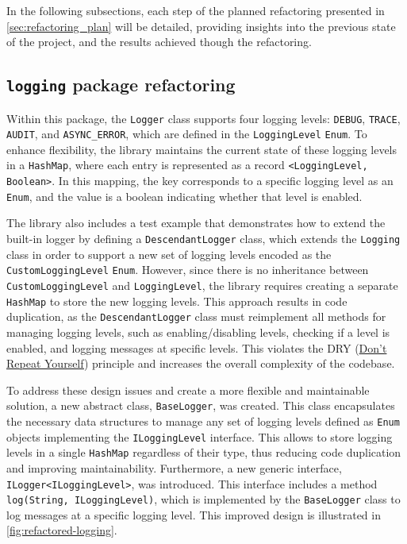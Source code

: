 In the following subsections, each step of the planned refactoring presented in \autoref{sec:refactoring_plan} will be detailed, providing insights into the previous state of the project, and the results achieved though the refactoring.

\subsection{\texttt{logging} package refactoring}

Within this package, the \texttt{Logger} class supports four logging levels: \texttt{DEBUG}, \texttt{TRACE}, \texttt{AUDIT}, and \texttt{ASYNC\_ERROR}, which are defined in the \texttt{LoggingLevel} \texttt{Enum}. To enhance flexibility, the library maintains the current state of these logging levels in a \texttt{HashMap}, where each entry is represented as a record \texttt{<LoggingLevel, Boolean>}. In this mapping, the key corresponds to a specific logging level as an \texttt{Enum}, and the value is a boolean indicating whether that level is enabled.

The library also includes a test example that demonstrates how to extend the built-in logger by defining a \texttt{DescendantLogger} class, which extends the \texttt{Logging} class in order to support a new set of logging levels encoded as the \texttt{CustomLoggingLevel} \texttt{Enum}. However, since there is no inheritance between \texttt{CustomLoggingLevel} and \texttt{LoggingLevel}, the library requires creating a separate \texttt{HashMap} to store the new logging levels. This approach results in code duplication, as the \texttt{DescendantLogger} class must reimplement all methods for managing logging levels, such as enabling/disabling levels, checking if a level is enabled, and logging messages at specific levels. This violates the DRY (\href{https://en.wikipedia.org/wiki/Don%27t_repeat_yourself}{Don't Repeat Yourself}) principle and increases the overall complexity of the codebase.

To address these design issues and create a more flexible and maintainable solution, a new abstract class, \texttt{BaseLogger}, was created. This class encapsulates the necessary data structures to manage any set of logging levels defined as \texttt{Enum} objects implementing the \texttt{ILoggingLevel} interface. This allows to store logging levels in a single \texttt{HashMap} regardless of their type, thus reducing code duplication and improving maintainability. Furthermore, a new generic interface, \texttt{ILogger<ILoggingLevel>}, was introduced. This interface includes a method \texttt{log(String, ILoggingLevel)}, which is implemented by the \texttt{BaseLogger} class to log messages at a specific logging level. This improved design is illustrated in \autoref{fig:refactored-logging}.

